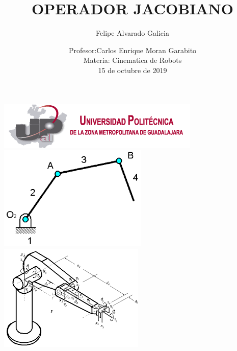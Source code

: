 \documentclass[12pt,a4paper]{article}
\author{Felipe Alvarado Galicia}
\title{OPERADOR JACOBIANO}
\date{Profesor:Carlos Enrique Moran Garabito\\
Materia: Cinematica de Robots\\
15 de octubre de 2019}
\begin{document}
\maketitle
 \includegraphics[scale=1]{logo1.png}\\
\includegraphics[scale=1]{imag5.png} 
\includegraphics[scale=1]{imag8.png}\\\\\\\\\\\\\\\\\\\\\\\\\\\\\\\\\\\\\\\\\\\\\\
\end{document}
